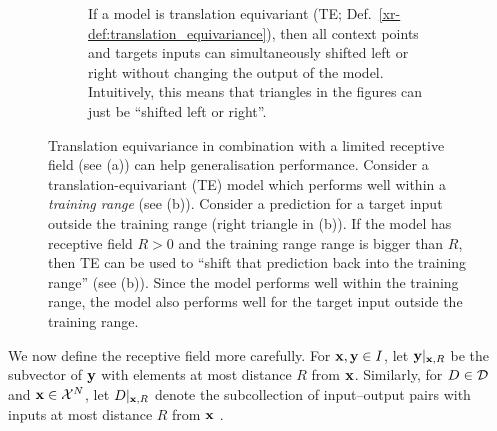 \documentclass[12pt]{report}
\newcommand{\xrprefix}[1]{xr-#1}
\begin{document}
\begin{figure}[t]
\begin{subfigure}[t]{0.49\linewidth}
        \caption{
            If a model is translation equivariant (TE; Def.\ \ref{\xrprefix{def:translation_equivariance}}),
            then all context points and targets inputs can simultaneously shifted left or right
            without changing the output of the model.
            Intuitively, this means that triangles in the figures can just be ``shifted left or right''. %
        }
    \end{subfigure}
    \caption[
       Translation equivariance can help generalisation
    ]{
        Translation equivariance in combination with a limited receptive field (see (a)) can help generalisation performance.
        Consider a translation-equivariant (TE) model which performs well within a \emph{training range} (see (b)).
        Consider a prediction for a target input outside the training range (right triangle in (b)).
        If the model has receptive field $R > 0$ and the training range range is bigger than $R$, then TE can be used to ``shift that prediction back into the training range'' (see (b)).
        Since the model performs well within the training range, the model also performs well for the target input outside the training range.
    }
    \label{fig:generalisation}
\end{figure}


We now define the receptive field more carefully.
For $\mathbf{x}, \mathbf{y} \in I$, let $\mathbf{y}|_{\mathbf{x},R}$ be the subvector of $\mathbf{y}$ with elements at most distance $R$ from $\mathbf{x}$.
Similarly, for $D \in \mathcal{D}$ and $\mathbf{x} \in \mathcal{X}^N$, let $D|_{\mathbf{x},R}$ denote the subcollection of input--output pairs with inputs at most distance $R$ from $\mathbf{x}$ .
\end{document}
